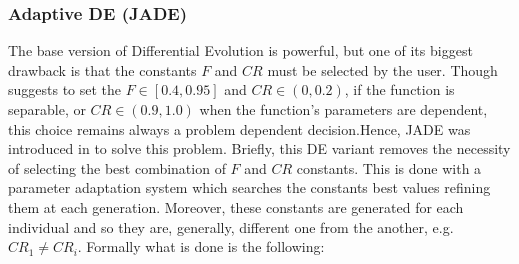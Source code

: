 \subsubsection{Adaptive DE (JADE)}
The base version of Differential Evolution is powerful, but one of its biggest drawback is that the constants $F$ and $CR$ must be selected by the user. Though \cite{RPODE:2005} suggests to set the $F\in[0.4, 0.95]$ and $CR \in (0, 0.2)$, if the function is separable, or $CR \in (0.9, 1.0)$ when the function's parameters are dependent, this choice remains always a problem dependent decision.Hence, JADE was introduced in \cite{JADE:2009} to solve this problem.\newline\newline
Briefly, this DE variant removes the necessity of selecting the best combination of $F$ and $CR$ constants. This is done with a parameter adaptation system which searches the constants best values refining them at each generation. Moreover, these constants are generated for each individual and so they are, generally, different one from the another, e.g. $\textit{CR}_{1} \neq \textit{CR}_{i}$. Formally what is done is the following:
